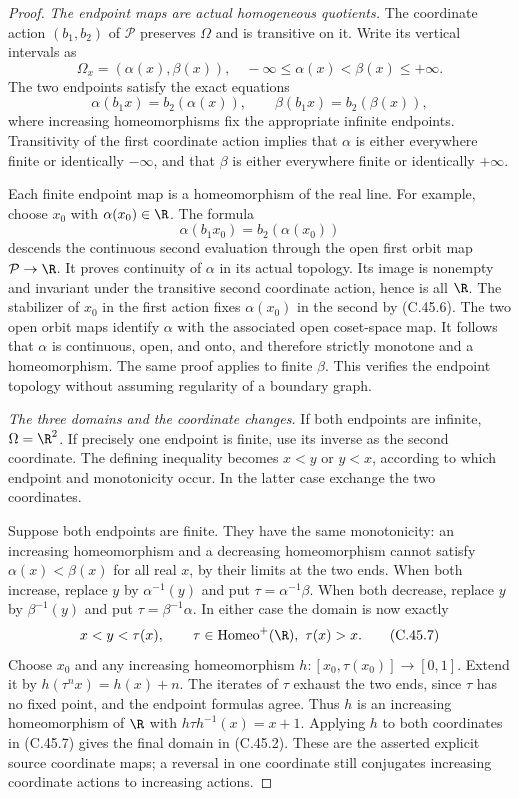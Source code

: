 \begin{proof}
\emph{The endpoint maps are actual homogeneous quotients.}
The coordinate action
$(b_1,b_2)$ of $\mathcal P$
preserves $\Omega$ and is
transitive on it.
Write its vertical intervals as
\[
 \Omega_x=(\alpha(x),\beta(x)),
 \quad -\infty\leq\alpha(x)<\beta(x)\leq+\infty.
                                                               \tag{C.45.5}
\]
The two endpoints satisfy the
exact equations
\[
 \alpha(b_1x)=b_2(\alpha(x)),\qquad
 \beta(b_1x)=b_2(\beta(x)),                               \tag{C.45.6}
\]
where increasing homeomorphisms
fix the appropriate infinite
endpoints.
Transitivity of the first
coordinate action implies that
$\alpha$ is either everywhere
finite or identically $-\infty$,
and that $\beta$ is either
everywhere finite or identically
$+\infty$.

Each finite endpoint map is a
homeomorphism of the real line.
For example, choose $x_0$ with
$\alpha(x_0)\in\R$. The formula
\[
 \alpha(b_1x_0)=b_2(\alpha(x_0))
\]
descends the continuous second
evaluation through the open
first orbit map
$\mathcal P\to\R$.
It proves continuity of
$\alpha$ in its actual
topology. Its image is
nonempty and invariant under
the transitive second coordinate
action, hence is all $\R$.
The stabilizer of $x_0$ in
the first action fixes
$\alpha(x_0)$ in the second
by (C.45.6). The two open
orbit maps identify $\alpha$
with the associated open
coset-space map.
It follows that $\alpha$ is
continuous, open, and onto,
and therefore strictly monotone
and a homeomorphism.
The same proof applies to
finite $\beta$.
This verifies the endpoint
topology without assuming
regularity of a boundary graph.

\emph{The three domains and the coordinate changes.}
If both endpoints are infinite,
$\Omega=\R^2$.
If precisely one endpoint is
finite, use its inverse as
the second coordinate.
The defining inequality becomes
$x<y$ or $y<x$, according to
which endpoint and monotonicity
occur. In the latter case
exchange the two coordinates.

Suppose both endpoints are
finite. They have the same
monotonicity: an increasing
homeomorphism and a decreasing
homeomorphism cannot satisfy
$\alpha(x)<\beta(x)$ for all
real $x$, by their limits at
the two ends.
When both increase, replace
$y$ by $\alpha^{-1}(y)$ and put
$\tau=\alpha^{-1}\beta$.
When both decrease, replace
$y$ by $\beta^{-1}(y)$ and put
$\tau=\beta^{-1}\alpha$.
In either case the domain is
now exactly
\[
                        x<y<\tau(x),
 \qquad \tau\in\operatorname{Homeo}^+(\R),\
                          \tau(x)>x.                    \tag{C.45.7}
\]
Choose $x_0$ and any increasing
homeomorphism
$h:[x_0,\tau(x_0)]\to[0,1]$.
Extend it by
$h(\tau^n x)=h(x)+n$.
The iterates of $\tau$ exhaust
the two ends, since $\tau$
has no fixed point, and the
endpoint formulas agree.
Thus $h$ is an increasing
homeomorphism of $\R$ with
$h\tau h^{-1}(x)=x+1$.
Applying $h$ to both
coordinates in (C.45.7)
gives the final domain in
(C.45.2).
These are the asserted
explicit source coordinate
maps; a reversal in one
coordinate still conjugates
increasing coordinate actions
to increasing actions.


\end{proof}
